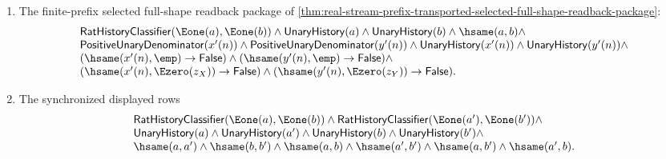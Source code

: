 \begin{theorem}
\begin{enumerate}
$$\begin{array}{l}
\mathsf{UnaryHistory}(b')\land\\
\hsame(a,a')\land
\hsame(b,b')\land
\hsame(a,b)\land
\hsame(a',b')\land
\hsame(a,b')\land
\hsame(a',b).
\end{array}
$$
\item The finite-prefix selected full-shape readback package of
\autoref{thm:real-stream-prefix-transported-selected-full-shape-readback-package}:
$$
\begin{array}{l}
\mathsf{RatHistoryClassifier}(\Eone(a),\Eone(b))\land
\mathsf{UnaryHistory}(a)\land \mathsf{UnaryHistory}(b)\land \hsame(a,b)\land\\
\mathsf{PositiveUnaryDenominator}(x'(n))\land
\mathsf{PositiveUnaryDenominator}(y'(n))\land
\mathsf{UnaryHistory}(x'(n))\land
\mathsf{UnaryHistory}(y'(n))\land\\
(\hsame(x'(n),\emp)\to\mathsf{False})\land
(\hsame(y'(n),\emp)\to\mathsf{False})\land\\
(\hsame(x'(n),\Ezero(z_X))\to\mathsf{False})\land
(\hsame(y'(n),\Ezero(z_Y))\to\mathsf{False}).
\end{array}
$$
\item The synchronized displayed rows
$$
\begin{array}{l}
\mathsf{RatHistoryClassifier}(\Eone(a),\Eone(b))\land
\mathsf{RatHistoryClassifier}(\Eone(a'),\Eone(b'))\land\\
\mathsf{UnaryHistory}(a)\land
\mathsf{UnaryHistory}(a')\land
\mathsf{UnaryHistory}(b)\land
\mathsf{UnaryHistory}(b')\land\\
\hsame(a,a')\land
\hsame(b,b')\land
\hsame(a,b)\land
\hsame(a',b')\land
\hsame(a,b')\land
\hsame(a',b).
\end{array}
$$
\end{enumerate}
\end{theorem}
